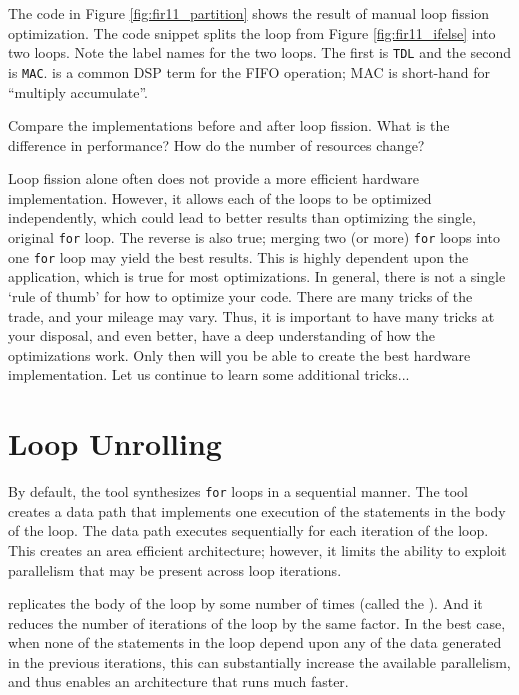 The code in Figure \ref{fig:fir11_partition} shows the result of manual loop fission optimization.  The code snippet splits the loop from Figure \ref{fig:fir11_ifelse} into two loops. Note the label names for the two loops. The first is \lstinline{TDL} and the second is \lstinline{MAC}.  is a common DSP term for the FIFO operation; MAC is short-hand for ``multiply accumulate''.

\begin{exercise}
Compare the implementations before and after loop fission. What is the difference in performance? How do the number of resources change?
\end{exercise}

Loop fission alone often does not provide a more efficient hardware implementation. However, it allows each of the loops to be optimized independently, which could lead to better results than optimizing the single, original \lstinline{for} loop. The reverse is also true; merging two (or more) \lstinline{for} loops into one \lstinline{for} loop may yield the best results. This is highly dependent upon the application, which is true for most optimizations. In general, there is not a single `rule of thumb' for how to optimize your code. There are many tricks of the trade, and your mileage may vary. Thus, it is important to have many tricks at your disposal, and even better, have a deep understanding of how the optimizations work. Only then will you be able to create the best hardware implementation. Let us continue to learn some additional tricks...

\section{Loop Unrolling}
By default, the \VHLS tool synthesizes \lstinline{for} loops in a sequential manner. The tool creates a data path that implements one execution of the statements in the body of the loop. The data path executes sequentially for each iteration of the loop. This creates an area efficient architecture; however, it limits the ability to exploit parallelism that may be present across loop iterations. 

 replicates the body of the loop by some number of times (called the ). And it reduces the number of iterations of the loop by the same factor. In the best case, when none of the statements in the loop depend upon any of the data generated in the previous iterations, this can substantially increase the available parallelism, and thus enables an architecture that runs much faster. 

